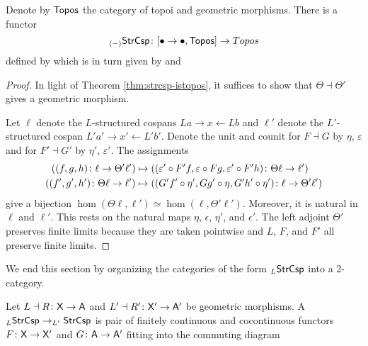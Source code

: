 \documentclass{amsart}
\begin{document}
\begin{theorem} \label{thm:strcsp-isfunctorial}
  Denote by $ \mathsf{Topos} $ the category of topoi and
  geometric morphisms. There is a functor
  \[
    _{(-)}\mathsf{StrCsp}
      \colon [\bullet \to \bullet, \mathsf{Topos} ]
      \to   Topos
  \]
  defined by  which is
  in turn given by  and
  
\end{theorem}
\begin{proof}
  In light of Theorem \ref{thm:strcsp-istopos}, it suffices
  to show that $ \Theta \dashv \Theta' $ gives a geometric
  morphism.

  Let $ \ell $ denote the $ L $-structured cospans
  $ La \to x \gets Lb$ and $\ell'$ denote the
  $ L' $-structured cospan $ L'a' \to x' \gets L'b'$. Denote
  the unit and counit for $F \dashv G$ by $ \eta $,
  $ \varepsilon $ and for $ F' \dashv G' $ by $ \eta' $,
  $ \varepsilon' $.  The assignments
  \begin{align*}
    \left( (f,g,h)\colon\ell\to\Theta'\ell' \right)
      & \mapsto
        \left( (\varepsilon'\circ F'f,
        \varepsilon\circ Fg,
        \varepsilon'\circ F'h )
        \colon\Theta\ell\to\ell'\right) \\
    \left( (f',g',h')\colon\Theta\ell\to\ell'\right)
      & \mapsto
        \left( (G'f'\circ\eta',Gg'\circ\eta,G'h'\circ\eta')
        \colon\ell\to\Theta'\ell'\right) 
  \end{align*}  
  give a bijection
  $ \hom (\Theta\ell,\ell') \simeq \hom (\ell,\Theta'\ell'
  )$. Moreover, it is natural in $\ell$ and $\ell'$. This
  rests on the natural maps $\eta$, $\epsilon$, $\eta'$, and
  $\epsilon'$. The left adjoint $\Theta'$ preserves finite
  limits because they are taken pointwise and $ L $, $ F $,
  and $ F' $ all preserve finite limits.
\end{proof}

We end this section by organizing the categories of the form
$ _L\mathsf{StrCsp} $ into a 2-category. 

\begin{definition} \label{df:str_csp_category}
  Let $ L \dashv R \colon \mathsf{X} \to \mathsf{A} $ and
  $ L' \dashv R' \colon \mathsf{X}' \to \mathsf{A}' $ be geometric
  morphisms. A 
  $ _L\mathsf{StrCsp} \to _{L'}\mathsf{StrCsp} $ is pair of finitely
  continuous and cocontinuous functors
  $ F \colon \mathsf{X} \to \mathsf{X}' $ and $ G \colon \mathsf{A} \to \mathsf{A}' $ fitting
  into the commuting diagram
  
\end{definition}
\end{document}
